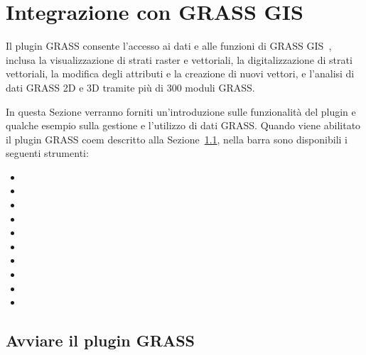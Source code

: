 
\section{Integrazione con GRASS GIS}\label{sec:grass}


Il plugin GRASS consente l'accesso ai dati e alle funzioni di GRASS
GIS~\cite{GRASSweb}, inclusa la visualizzazione di strati raster e vettoriali,
la digitalizzazione di strati vettoriali, la modifica degli attributi e la
creazione di nuovi vettori, e l'analisi di dati GRASS 2D e 3D tramite più di
300 moduli GRASS.

In questa Sezione verranno forniti un'introduzione sulle funzionalità del plugin
e qualche esempio sulla gestione e l'utilizzo di dati GRASS. Quando viene
abilitato il plugin GRASS coem descritto alla Sezione~\ref{sec:starting_grass},
nella barra sono disponibili i seguenti strumenti:
 
\begin{itemize}
\item {}
\item {}
\item {}
\item {}
\item {}
\item {}
\item {}
\item {}
\item {} 
\item {}
\end{itemize}

\subsection{Avviare il plugin GRASS}\label{sec:starting_grass}

